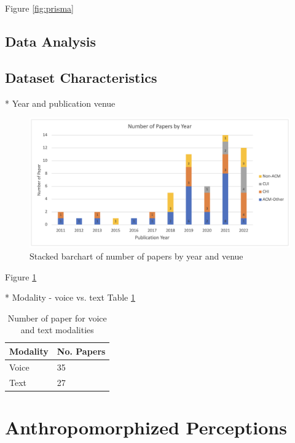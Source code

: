 \documentclass[sigconf,screen,review, anonymous]{acmart}
\begin{document}
Figure \ref{fig:prisma}

\subsection{Data Analysis}



\subsection{Dataset Characteristics}

* Year and publication venue

\begin{figure}[h]
  \centering
  \includegraphics[width=\textwidth]{fig-paper.png}
  \caption{Stacked barchart of number of papers by year and venue}
  \label{fig:paper}
\end{figure}

Figure \ref{fig:paper}


\newline
* Modality - voice vs. text Table \ref{tab:modality}

\begin{table}[]
\begin{tabular}{@{}ll@{}}
\toprule
\textbf{Modality} & \textbf{No. Papers} \\ \midrule
Voice             & 35                  \\
Text              & 27                  \\ \bottomrule
\end{tabular}%
\caption{Number of paper for voice and text modalities}
\label{tab:modality}
\end{table}

\section{Anthropomorphized Perceptions}
\end{document}
